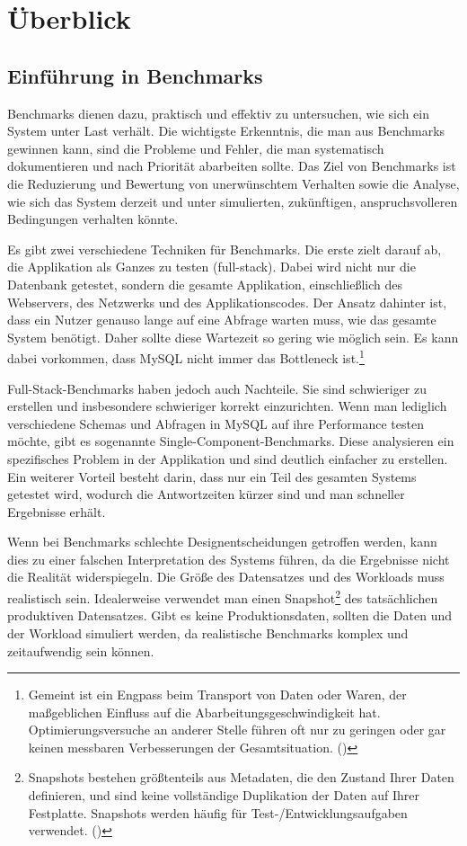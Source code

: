 \chapter{Überblick}

\section{Einführung in Benchmarks}

Benchmarks dienen dazu, praktisch und effektiv zu untersuchen, wie sich ein
System unter Last verhält. Die wichtigste Erkenntnis, die man aus Benchmarks
gewinnen kann, sind die Probleme und Fehler, die man systematisch dokumentieren
und nach Priorität abarbeiten sollte. Das Ziel von Benchmarks ist die Reduzierung
und Bewertung von unerwünschtem Verhalten sowie die Analyse, wie sich das
System derzeit und unter simulierten, zukünftigen, anspruchsvolleren Bedingungen
verhalten könnte.

Es gibt zwei verschiedene Techniken für Benchmarks. Die erste zielt darauf ab,
die Applikation als Ganzes zu testen (full-stack). Dabei wird nicht nur die
Datenbank getestet, sondern die gesamte Applikation, einschließlich des Webservers,
des Netzwerks und des Applikationscodes. Der Ansatz dahinter ist, dass ein Nutzer
genauso lange auf eine Abfrage warten muss, wie das gesamte System benötigt.
Daher sollte diese Wartezeit so gering wie möglich sein. Es kann dabei vorkommen,
dass MySQL nicht immer das Bottleneck ist.\footnote{Gemeint ist ein Engpass beim Transport von Daten oder Waren, der maßgeblichen Einfluss auf die Abarbeitungsgeschwindigkeit hat. Optimierungsversuche an anderer Stelle führen oft nur zu geringen oder gar keinen messbaren Verbesserungen der Gesamtsituation. (\cite{bottleneck})}

Full-Stack-Benchmarks haben jedoch auch Nachteile. Sie sind schwieriger zu erstellen
und insbesondere schwieriger korrekt einzurichten. Wenn man lediglich verschiedene
Schemas und Abfragen in MySQL auf ihre Performance testen möchte, gibt es sogenannte
Single-Component-Benchmarks. Diese analysieren ein spezifisches Problem in der
Applikation und sind deutlich einfacher zu erstellen. Ein weiterer Vorteil besteht
darin, dass nur ein Teil des gesamten Systems getestet wird, wodurch die Antwortzeiten
kürzer sind und man schneller Ergebnisse erhält.

Wenn bei Benchmarks schlechte Designentscheidungen getroffen werden, kann dies zu einer
falschen Interpretation des Systems führen, da die Ergebnisse nicht die Realität widerspiegeln.
Die Größe des Datensatzes und des Workloads muss realistisch sein. Idealerweise verwendet
man einen Snapshot\footnote{Snapshots bestehen größtenteils aus Metadaten, die den Zustand Ihrer Daten definieren, und sind keine vollständige Duplikation der Daten auf Ihrer Festplatte. Snapshots werden häufig für Test-/Entwicklungsaufgaben verwendet. (\cite{snapshot}) } des tatsächlichen produktiven Datensatzes.
Gibt es keine Produktionsdaten, sollten die Daten und der Workload simuliert werden,
da realistische Benchmarks komplex und zeitaufwendig sein können.

